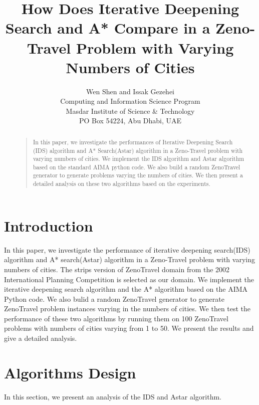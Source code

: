 \documentclass[letterpaper]{article}
\begin{document}
%
\title{How Does Iterative Deepening Search and A* Compare in a Zeno-Travel Problem with Varying Numbers of Cities}
\author{Wen Shen and Issak Gezehei \\
Computing and Information Science Program\\
Masdar Institute of Science \& Technology\\
PO Box 54224, Abu Dhabi, UAE\\
}
\maketitle
\begin{abstract}
\begin{quote}
In this paper, we investigate the performances of Iterative Deepening Search (IDS) algorithm and A* Search(Astar) algorithm in a Zeno-Travel problem with varying numbers of cities. We implement the IDS algorithm and Astar algorithm based on the standard AIMA python code. We also build a random ZenoTravel generator to generate problems varying the numbers of cities. We then present a detailed analysis on these two algorithms based on the experiments.
\end{quote}
\end{abstract}

\section{Introduction}
In this paper, we investigate the performance of iterative deepening search(IDS) algorithm and A* search(Astar) algorithm in a Zeno-Travel problem with varying numbers of cities. The strips version of ZenoTravel domain from the 2002 International Planning Competition is selected as our domain. We implement the iterative deepening search algorithm and the A* algorithm based on the AIMA Python code. We also bulid a random ZenoTravel generator to generate ZenoTravel problem instances varying in the numbers of cities. We then test the performance of these two algorithms by running them on 100   ZenoTravel problems with numbers of cities varying from 1 to 50. We present the results and give a detailed analysis.

\section{Algorithms Design}
In this section, we present an analysis of the IDS and Astar algorithm.
\end{document}
